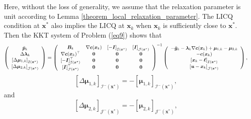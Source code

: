 \documentclass[aos]{imsart}
\numberwithin{equation}{section}
\theoremstyle{plain}
\begin{document}
   Here, without the loss of generality, we assume that the relaxation parameter is unit according to Lemma \ref{theorem_local_relaxation_parameter}. The LICQ condition at $\bm{x}^{*}$ also implies the LICQ at $\bm{x}_k$ when $\bm{x}_k$ is sufficiently close to $\bm{x}^{*}$. Then the KKT system of Problem (\ref{eq9}) shows that
   \begin{equation}
   \footnotesize
\label{eq29}
    \left( \begin{array}{c}
        \Bar{\bm{p}}_k \\
        \Delta \bm{\lambda}_{k}\\
        \left[\Delta \bm{\mu}_{1,k} \right]_{\mathcal{I}(\bm{x}^{*})} \\
        \left[\Delta \bm{\mu}_{2,k} \right]_{\mathcal{J}(\bm{x}^{*})}
    \end{array} \right) =  \left( \begin{array}{cccc}
           \bm{B}_k & \nabla \bm{c}(\bm{x}_k) & \left[-\bm{I}\right]_{\mathcal{I}(\bm{x}^{*})} & \left[\bm{I}\right]_{\mathcal{J}(\bm{x}^{*})}\\
           \nabla \bm{c}(\bm{x}_k)^{\top} & \bm{0} & \bm{0} & \bm{0}\\
           \left[-\bm{I}\right]_{\mathcal{I}(\bm{x}^{*})}^{\top} & \bm{0} & \bm{0} & \bm{0} \\
           \left[\bm{I}\right]_{\mathcal{J}(\bm{x}^{*})}^{\top} & \bm{0} & \bm{0} & \bm{0}
       \end{array} \right)^{-1} \left( \begin{array}{c}
        - \Bar{\bm{g}}_k - \bm{\lambda}_{k} \nabla \bm{c}(\bm{x}_k)  + \bm{\mu}_{1,k} - \bm{\mu}_{2,k}\\
        -\bm{c}(\bm{x}_k)\\
        \left[\bm{x}_k - \bm{\ell}\right]_{\mathcal{I}(\bm{x}^{*})}\\
        \left[\bm{u} - \bm{x}_{k}\right]_{\mathcal{J}(\bm{x}^{*})}
       \end{array} \right),
\end{equation}
\begin{equation*}
    \left[\Delta \bm{\mu}_{1,k} \right]_{\mathcal{I}^{-}(\bm{x}^{*})} = - \left[ \bm{\mu}_{1,k} \right]_{\mathcal{I}^{-}(\bm{x}^{*})},
\end{equation*}
and
\begin{equation*}
    \left[\Delta \bm{\mu}_{2,k} \right]_{\mathcal{J}^{-}(\bm{x}^{*})} = - \left[ \bm{\mu}_{2,k} \right]_{\mathcal{J}^{-}(\bm{x}^{*})},
\end{equation*}
\end{document}
